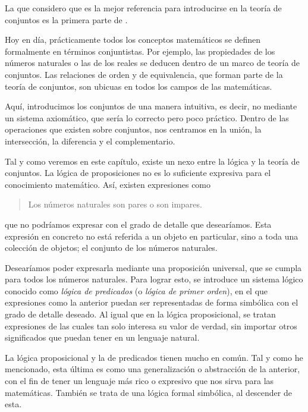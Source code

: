 



La que considero que es la mejor referencia para introducirse en la teoría
de conjuntos es la primera parte de \cite{open-logic}.

Hoy en día, prácticamente todos los conceptos matemáticos se definen
formalmente en términos conjuntistas. Por ejemplo, las propiedades de los
números naturales o las de los reales se deducen dentro de un marco de
teoría de conjuntos. Las relaciones de orden y de equivalencia, que forman
parte de la teoría de conjuntos, son ubicuas en todos los campos de las
matemáticas.

Aquí, introducimos los conjuntos de una manera intuitiva, es decir, no
mediante un sistema axiomático, que sería lo correcto pero poco práctico.
Dentro de las operaciones que existen sobre conjuntos, nos centramos en la
unión, la intersección, la diferencia y el complementario.

Tal y como veremos en este capítulo, existe un nexo entre la lógica y la
teoría de conjuntos. La lógica de proposiciones no es lo suficiente
expresiva para el conocimiento matemático. Así, existen expresiones como

\begin{quote}
  Los números naturales son pares o son impares.
\end{quote}

\noindent que no podríamos expresar con el grado de detalle que desearíamos.
Esta expresión en concreto no está referida a un objeto en particular, sino
a toda una colección de objetos; el conjunto de los números naturales.

Desearíamos poder expresarla mediante una proposición universal, que se
cumpla para todos los números naturales. Para lograr esto, se introduce un
sistema lógico conocido como \emph{lógica de predicados} (o \emph{lógica de
primer orden}), en el que expresiones como la anterior puedan ser
representadas de forma simbólica con el grado de detalle deseado. Al igual
que en la lógica proposicional, se tratan expresiones de las cuales tan solo
interesa su valor de verdad, sin importar otros significados que puedan
tener en un lenguaje natural.

La lógica proposicional y la de predicados tienen mucho en común. Tal y como
he mencionado, esta última es como una generalización o abstracción de la
anterior, con el fin de tener un lenguaje más rico o expresivo que nos sirva
para las matemáticas. También se trata de una lógica formal simbólica, al
descender de esta.




